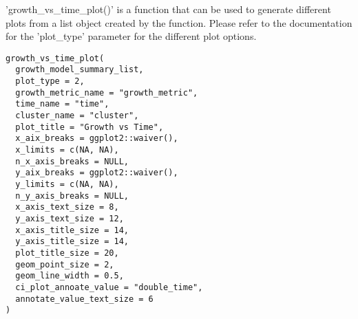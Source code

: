 \documentclass[a4paper]{book}
\begin{document}
%
\begin{Description}
'growth\_vs\_time\_plot()' is a function that can be used to generate
different plots from a list object created by the
 function.
Please refer to the documentation for the 'plot\_type' parameter for the
different plot options.
\end{Description}
%
\begin{Usage}
\begin{verbatim}
growth_vs_time_plot(
  growth_model_summary_list,
  plot_type = 2,
  growth_metric_name = "growth_metric",
  time_name = "time",
  cluster_name = "cluster",
  plot_title = "Growth vs Time",
  x_aix_breaks = ggplot2::waiver(),
  x_limits = c(NA, NA),
  n_x_axis_breaks = NULL,
  y_aix_breaks = ggplot2::waiver(),
  y_limits = c(NA, NA),
  n_y_axis_breaks = NULL,
  x_axis_text_size = 8,
  y_axis_text_size = 12,
  x_axis_title_size = 14,
  y_axis_title_size = 14,
  plot_title_size = 20,
  geom_point_size = 2,
  geom_line_width = 0.5,
  ci_plot_annoate_value = "double_time",
  annotate_value_text_size = 6
)
\end{verbatim}
\end{Usage}
%
\end{document}
